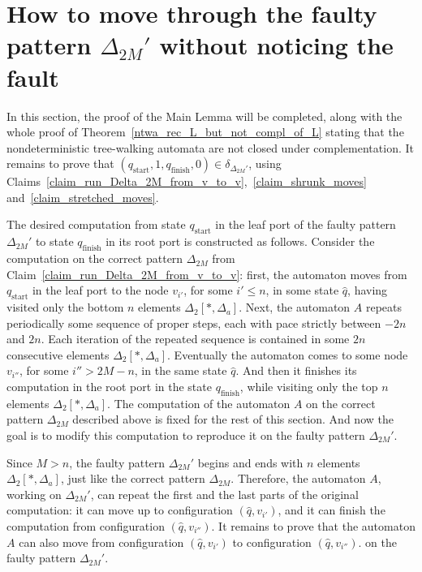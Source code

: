 \documentclass[12pt,a4paper]{article}
\theoremstyle{definition}
\begin{document}
\section{How to move through the faulty pattern $\Delta_{2M}'$ without noticing the fault}\label{section_passing_through_Delta_prime_without_noticing_error}

In this section,
the proof of the Main Lemma will be completed,
along with the whole proof of Theorem~\ref{ntwa_rec_L_but_not_compl_of_L}
stating that the nondeterministic tree-walking automata are not closed under complementation.
It remains to prove that
$(q_{\text{start}},1,q_{\text{finish}},0) \in \delta_{\Delta_{2M}'}$,
using Claims~\ref{claim_run_Delta_2M_from_v_to_v},~\ref{claim_shrunk_moves}
and~\ref{claim_stretched_moves}.

The desired computation
from state $q_{\text{start}}$ in the leaf port of the faulty pattern $\Delta_{2M}'$
to state $q_{\text{finish}}$ in its root port
is constructed as follows.
Consider the computation on the correct pattern $\Delta_{2M}$
from Claim~\ref{claim_run_Delta_2M_from_v_to_v}:
first, the automaton moves from $q_{\text{start}}$ in the leaf port
to the node $v_{i'}$, for some $i' \leqslant n$, in some state $\widehat{q}$,
having visited only the bottom $n$ elements $\Delta_2[*,\Delta_a]$.
Next, the automaton $A$ repeats periodically
some sequence of proper steps, each with pace strictly between $-2n$ and $2n$.
Each iteration of the repeated sequence
is contained in some $2n$ consecutive elements $\Delta_2[*,\Delta_a]$.
Eventually the automaton comes to some node $v_{i''}$, for some $i'' > 2M-n$, in the same state $\widehat{q}$.
And then it finishes its computation
in the root port in the state $q_{\text{finish}}$,
while visiting only the top $n$ elements $\Delta_2[*,\Delta_a]$.
The computation of the automaton $A$ on the correct pattern $\Delta_{2M}$ described above
is fixed for the rest of this section.
And now the goal is to modify this computation
to reproduce it on the faulty pattern $\Delta_{2M}'$.

Since $M > n$, the faulty pattern $\Delta_{2M}'$
begins and ends with $n$ elements $\Delta_2[*,\Delta_a]$,
just like the correct pattern $\Delta_{2M}$.
Therefore, the automaton $A$, working on $\Delta_{2M}'$,
can repeat the first and the last parts of the original computation:
it can move up to configuration $(\widehat{q},v_{i'})$,
and it can finish the computation from configuration $(\widehat{q},v_{i''})$.
It remains to prove that the automaton $A$
can also move from configuration $(\widehat{q},v_{i'})$
to configuration $(\widehat{q},v_{i''})$.
on the faulty pattern $\Delta_{2M}'$.
\end{document}
